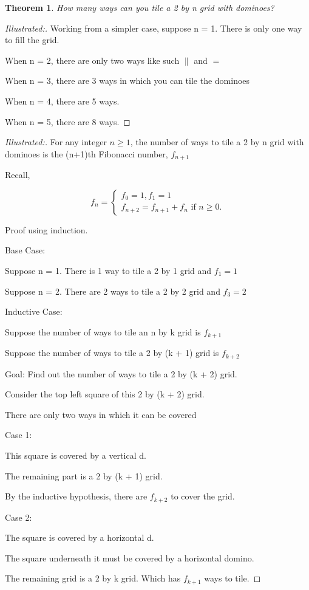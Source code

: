 \documentclass[12pt]{article}
\newtheorem{theorem}{Theorem}[section]
\begin{document}
\newpage

\begin{theorem}
    How many ways can you tile a 2 by n grid with dominoes?
\end{theorem}

\begin{proof}[Illustrated:]

    Working from a simpler case, suppose n = 1. There is only one way to fill the grid.

    When n = 2, there are only two ways like such $\|$ and $=$

    When n = 3, there are 3 ways in which you can tile the dominoes

    When n = 4, there are 5 ways.

    When n = 5, there are 8 ways.
\end{proof}

\begin{proof}[Illustrated:]
    For any integer $n \geq 1$, the number of ways to tile a 2 by n grid with dominoes is the (n+1)th Fibonacci number, $f_{n+1}$

    Recall,

    \[
    f_n = 
        \begin{cases}
        f_0 = 1, f_1 = 1 \\
        f_{n+2} = f_{n+1} + f_n \text{ if } n \geq 0.
        \end{cases}
    \]

    Proof using induction.

    Base Case: 
    
    Suppose n = 1. There is 1 way to tile a 2 by 1 grid and $f_1 = 1$

    Suppose n = 2. There are 2 ways to tile a 2 by 2 grid and $f_3 = 2$

    Inductive Case: 
    
    Suppose the number of ways to tile an n by k grid is $f_{k + 1}$

    Suppose the number of ways to tile a 2 by (k + 1) grid is $f_{k + 2}$

    Goal: Find out the number of ways to tile a 2 by (k + 2) grid.

    Consider the top left square of this 2 by (k + 2) grid.

    There are only two ways in which it can be covered

    Case 1: 

    This square is covered by a vertical d.

    The remaining part is a 2 by (k + 1) grid.

    By the inductive hypothesis, there are $f_{k + 2}$ to cover the grid.

    Case 2:

    The square is covered by a horizontal d.

    The square underneath it must be covered by a horizontal domino.

    The remaining grid is a 2 by k grid. Which has $f_{k + 1}$ ways to tile.
\end{proof}
\end{document}
